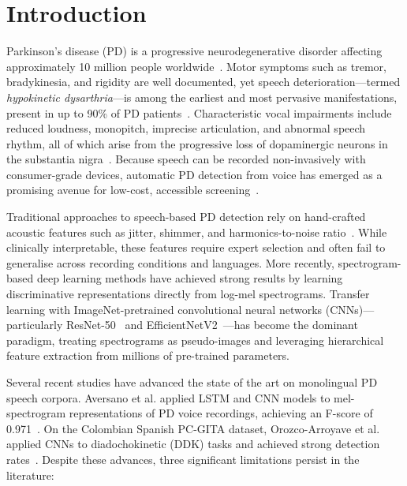 \documentclass[conference]{IEEEtran}
\begin{document}
\section{Introduction}

Parkinson's disease (PD) is a progressive neurodegenerative disorder affecting approximately 10 million people worldwide~\cite{dorsey2018}. Motor symptoms such as tremor, bradykinesia, and rigidity are well documented, yet speech deterioration---termed \textit{hypokinetic dysarthria}---is among the earliest and most pervasive manifestations, present in up to 90\% of PD patients~\cite{ho1999}. Characteristic vocal impairments include reduced loudness, monopitch, imprecise articulation, and abnormal speech rhythm, all of which arise from the progressive loss of dopaminergic neurons in the substantia nigra~\cite{duffy2013}. Because speech can be recorded non-invasively with consumer-grade devices, automatic PD detection from voice has emerged as a promising avenue for low-cost, accessible screening~\cite{sakar2013}.

Traditional approaches to speech-based PD detection rely on hand-crafted acoustic features such as jitter, shimmer, and harmonics-to-noise ratio~\cite{tsanas2012}. While clinically interpretable, these features require expert selection and often fail to generalise across recording conditions and languages. More recently, spectrogram-based deep learning methods have achieved strong results by learning discriminative representations directly from log-mel spectrograms. Transfer learning with ImageNet-pretrained convolutional neural networks (CNNs)---particularly ResNet-50~\cite{he2016} and EfficientNetV2~\cite{tan2021}---has become the dominant paradigm, treating spectrograms as pseudo-images and leveraging hierarchical feature extraction from millions of pre-trained parameters.

Several recent studies have advanced the state of the art on monolingual PD speech corpora. Aversano et al. applied LSTM and CNN models to mel-spectrogram representations of PD voice recordings, achieving an F-score of 0.971~\cite{aversano2024}. On the Colombian Spanish PC-GITA dataset, Orozco-Arroyave et al. applied CNNs to diadochokinetic (DDK) tasks and achieved strong detection rates~\cite{orozco2014}. Despite these advances, three significant limitations persist in the literature:
\end{document}
